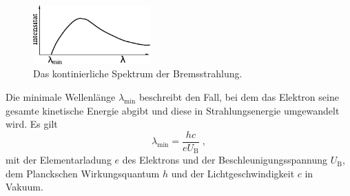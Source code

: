     \begin{figure}
        \centering
        \includegraphics[width=0.4\textwidth]{content/img/Abb_1.pdf}
        \caption{Das kontinierliche Spektrum der Bremsstrahlung. \cite{versuchsanleitung}}
        \label{fig:Bremsspektrum}
    \end{figure}

    Die minimale Wellenlänge $\lambda_\text{min}$ beschreibt den Fall,
    bei dem das Elektron seine gesamte kinetische Energie abgibt und diese in Strahlungsenergie umgewandelt wird.
    Es gilt
    \begin{equation*}
        \lambda_\text{min} = \frac{hc}{eU_\text{B}} \; ,
    \end{equation*}
    mit der Elementarladung $e$ des Elektrons und der Beschleunigungsspannung $U_\text{B}$,
    dem Planckschen Wirkungsquantum $h$ und der Lichtgeschwindigkeit $c$ in Vakuum.

